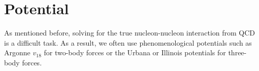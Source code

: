 \section{Potential}
As mentioned before, solving for the true nucleon-nucleon interaction from QCD is a difficult task. As a result, we often use phenomenological potentials such as Argonne $v_{18}$ for two-body forces or the Urbana or Illinois potentials for three-body forces.
